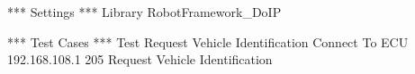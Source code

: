         \begin{robotcode}
*** Settings ***
Library    RobotFramework_DoIP

*** Test Cases ***
Test Request Vehicle Identification
    Connect To ECU     192.168.108.1      205
    Request Vehicle Identification 

        \end{robotcode}


